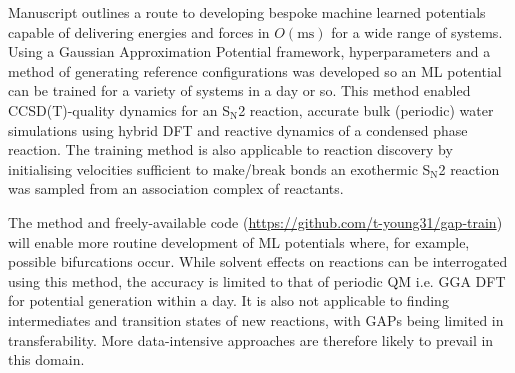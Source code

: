 \documentclass[../../main.tex]{subfiles}
\begin{document}
Manuscript  outlines a route to developing bespoke machine learned potentials capable of delivering energies and forces in $O(\text{ms})$ for a wide range of systems. Using a Gaussian Approximation Potential framework,\cite{Bartok2010} hyperparameters and a method of generating reference configurations was developed so an ML potential can be trained for a variety of systems in a day or so. This method enabled CCSD(T)-quality dynamics for an S${}_\text{N}$2 reaction, accurate bulk (periodic) water simulations using hybrid DFT and reactive dynamics of a condensed phase reaction. The training method is also applicable to reaction discovery by initialising velocities sufficient to make/break bonds an exothermic  S${}_\text{N}$2 reaction was sampled from an association complex of reactants.

The method and freely-available code ({\url{https://github.com/t-young31/gap-train}}) will enable more routine development of ML potentials where, for example, possible bifurcations occur. While solvent effects on reactions can be interrogated using this method, the accuracy is limited to that of periodic QM i.e. GGA DFT for potential generation within a day. It is also not applicable to finding intermediates and transition states of new reactions, with GAPs being limited in transferability. More data-intensive approaches are therefore likely to prevail in this domain.\cite{Smith2017, Devereux2020} 


\clearpage
\end{document}
